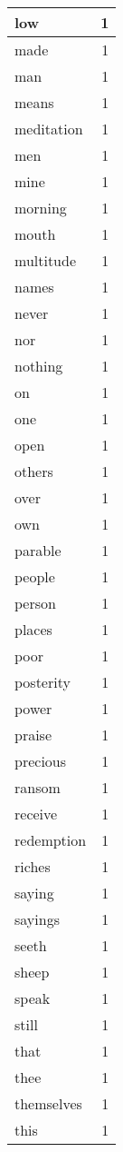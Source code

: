 \begin{center}
\begin{longtable}{l|r}
low & 1 \\ \hline
made & 1 \\ \hline
man & 1 \\ \hline
means & 1 \\ \hline
meditation & 1 \\ \hline
men & 1 \\ \hline
mine & 1 \\ \hline
morning & 1 \\ \hline
mouth & 1 \\ \hline
multitude & 1 \\ \hline
names & 1 \\ \hline
never & 1 \\ \hline
nor & 1 \\ \hline
nothing & 1 \\ \hline
on & 1 \\ \hline
one & 1 \\ \hline
open & 1 \\ \hline
others & 1 \\ \hline
over & 1 \\ \hline
own & 1 \\ \hline
parable & 1 \\ \hline
people & 1 \\ \hline
person & 1 \\ \hline
places & 1 \\ \hline
poor & 1 \\ \hline
posterity & 1 \\ \hline
power & 1 \\ \hline
praise & 1 \\ \hline
precious & 1 \\ \hline
ransom & 1 \\ \hline
receive & 1 \\ \hline
redemption & 1 \\ \hline
riches & 1 \\ \hline
saying & 1 \\ \hline
sayings & 1 \\ \hline
seeth & 1 \\ \hline
sheep & 1 \\ \hline
speak & 1 \\ \hline
still & 1 \\ \hline
that & 1 \\ \hline
thee & 1 \\ \hline
themselves & 1 \\ \hline
this & 1 \\ \hline

\end{longtable}
\end{center}
